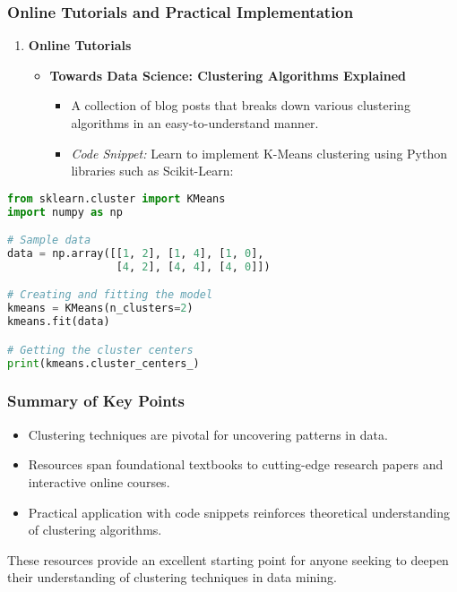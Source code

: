 \documentclass[aspectratio=169]{beamer}
\begin{document}
\begin{frame}[fragile]
    \frametitle{Online Tutorials and Practical Implementation}
    \begin{enumerate}[resume]
        \item \textbf{Online Tutorials}
            \begin{itemize}
                \item \textbf{Towards Data Science: Clustering Algorithms Explained}
                    \begin{itemize}
                        \item A collection of blog posts that breaks down various clustering algorithms in an easy-to-understand manner.
                        \item \textit{Code Snippet:} Learn to implement K-Means clustering using Python libraries such as Scikit-Learn:
                    \end{itemize}
            \end{itemize}
    \end{enumerate}
    
    \begin{lstlisting}[language=python]
from sklearn.cluster import KMeans
import numpy as np

# Sample data
data = np.array([[1, 2], [1, 4], [1, 0],
                 [4, 2], [4, 4], [4, 0]])

# Creating and fitting the model
kmeans = KMeans(n_clusters=2)
kmeans.fit(data)

# Getting the cluster centers
print(kmeans.cluster_centers_)
    \end{lstlisting}
\end{frame}

\begin{frame}[fragile]
    \frametitle{Summary of Key Points}
    \begin{itemize}
        \item Clustering techniques are pivotal for uncovering patterns in data.
        \item Resources span foundational textbooks to cutting-edge research papers and interactive online courses.
        \item Practical application with code snippets reinforces theoretical understanding of clustering algorithms.
    \end{itemize}
    
    These resources provide an excellent starting point for anyone seeking to deepen their understanding of clustering techniques in data mining.
\end{frame}
\end{document}
